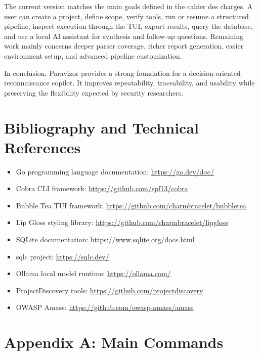 \documentclass[a4paper,12pt]{article}
\begin{document}
The current version matches the main goals defined in the cahier des charges. A user can create a project, define scope, verify tools, run or resume a structured pipeline, inspect execution through the TUI, export results, query the database, and use a local AI assistant for synthesis and follow-up questions. Remaining work mainly concerns deeper parser coverage, richer report generation, easier environment setup, and advanced pipeline customization.

In conclusion, Paravizor provides a strong foundation for a decision-oriented reconnaissance copilot. It improves repeatability, traceability, and usability while preserving the flexibility expected by security researchers.

\newpage

\section*{Bibliography and Technical References}

\begin{itemize}
    \item Go programming language documentation: \url{https://go.dev/doc/}
    \item Cobra CLI framework: \url{https://github.com/spf13/cobra}
    \item Bubble Tea TUI framework: \url{https://github.com/charmbracelet/bubbletea}
    \item Lip Gloss styling library: \url{https://github.com/charmbracelet/lipgloss}
    \item SQLite documentation: \url{https://www.sqlite.org/docs.html}
    \item sqlc project: \url{https://sqlc.dev/}
    \item Ollama local model runtime: \url{https://ollama.com/}
    \item ProjectDiscovery tools: \url{https://github.com/projectdiscovery}
    \item OWASP Amass: \url{https://github.com/owasp-amass/amass}
\end{itemize}

\newpage

\appendix
\section{Appendix A: Main Commands}
\end{document}
